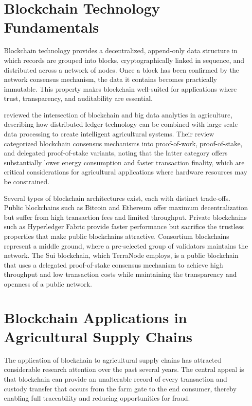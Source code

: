 \section{Blockchain Technology Fundamentals}

Blockchain technology provides a decentralized, append-only data structure in which records are grouped into blocks, cryptographically linked in sequence, and distributed across a network of nodes. Once a block has been confirmed by the network consensus mechanism, the data it contains becomes practically immutable. This property makes blockchain well-suited for applications where trust, transparency, and auditability are essential.

\textcite{chauhan2025blockchain} reviewed the intersection of blockchain and big data analytics in agriculture, describing how distributed ledger technology can be combined with large-scale data processing to create intelligent agricultural systems. Their review categorized blockchain consensus mechanisms into proof-of-work, proof-of-stake, and delegated proof-of-stake variants, noting that the latter category offers substantially lower energy consumption and faster transaction finality, which are critical considerations for agricultural applications where hardware resources may be constrained.

Several types of blockchain architectures exist, each with distinct trade-offs. Public blockchains such as Bitcoin and Ethereum offer maximum decentralization but suffer from high transaction fees and limited throughput. Private blockchains such as Hyperledger Fabric provide faster performance but sacrifice the trustless properties that make public blockchains attractive. Consortium blockchains represent a middle ground, where a pre-selected group of validators maintains the network. The Sui blockchain, which TerraNode employs, is a public blockchain that uses a delegated proof-of-stake consensus mechanism to achieve high throughput and low transaction costs while maintaining the transparency and openness of a public network.

\section{Blockchain Applications in Agricultural Supply Chains}

The application of blockchain to agricultural supply chains has attracted considerable research attention over the past several years. The central appeal is that blockchain can provide an unalterable record of every transaction and custody transfer that occurs from the farm gate to the end consumer, thereby enabling full traceability and reducing opportunities for fraud.

